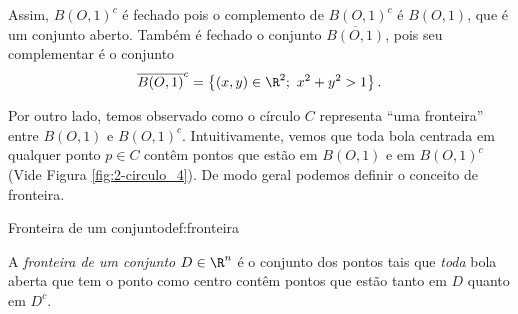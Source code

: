 \newpage 
Assim, $B(O,1)^c$ é fechado pois o complemento de $B(O,1)^c$ é $B(O,1)$, que é um conjunto aberto. Também é fechado o conjunto $\overline{B(O,1)}$, pois seu complementar é o conjunto
$$ \overline{B(O,1)}^c= \left\{(x,y)\in\R^2;~x^2+y^2 > 1\right\}.$$


Por outro lado, temos observado como o círculo $C$ representa ``uma fronteira'' entre $B(O,1)$ e $B(O,1)^c$. Intuitivamente, vemos que toda bola centrada em qualquer ponto $p\in C$ contêm pontos que estão em $B(O,1)$ e em $B(O,1)^c$ (Vide Figura \ref{fig:2-circulo_4}). De modo geral podemos definir o conceito de fronteira. 
\begin{definition}{Fronteira de um conjunto}{def:fronteira}
\begin{comment}
A \textit{fronteira de um conjunto}\index{fronteira de um conjunto}\index{conjunto!fronteira de um} \(D\in\R^n\) é definida por:
\[\partial D = \{x \in \mathbb{R}^n ;~ \forall \varepsilon > 0~ B(x, \varepsilon) \cap D \neq \emptyset \text{ e } B(x, \varepsilon) \cap (D^c) \neq \emptyset\},\]
onde \(B(x, \varepsilon)\) é a bola aberta centrada em \(x\) com raio \(\varepsilon\) e \(\emptyset\) representa o conjunto vazio.
\end{comment}
A \textit{fronteira de um conjunto} \(D\in\R^n\) é o conjunto dos pontos tais que \textit{toda} bola aberta que tem o ponto como centro contêm pontos que estão tanto em $D$ quanto em $D^c$.
\end{definition}

